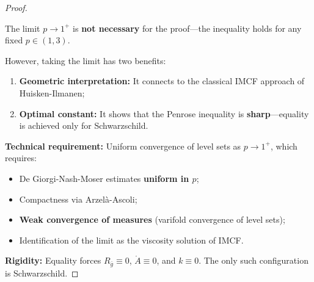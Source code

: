 \begin{proof}
\begin{remark}
The limit $p \to 1^+$ is \textbf{not necessary} for the proof---the inequality holds for any fixed $p \in (1, 3)$.

However, taking the limit has two benefits:
\begin{enumerate}
\item \textbf{Geometric interpretation:} It connects to the classical IMCF approach of Huisken-Ilmanen;
\item \textbf{Optimal constant:} It shows that the Penrose inequality is \textbf{sharp}---equality is achieved only for Schwarzschild.
\end{enumerate}

\textbf{Technical requirement:} Uniform convergence of level sets as $p \to 1^+$, which requires:
\begin{itemize}
\item De Giorgi-Nash-Moser estimates \textbf{uniform in $p$};
\item Compactness via Arzel\`a-Ascoli;
\item \textbf{Weak convergence of measures} (varifold convergence of level sets);
\item Identification of the limit as the viscosity solution of IMCF.
\end{itemize}
\end{remark}

\textbf{Rigidity:} Equality forces $R_{\bar{g}} \equiv 0$, $\mathring{A} \equiv 0$, and $k \equiv 0$. The only such configuration is Schwarzschild.
\end{proof}

